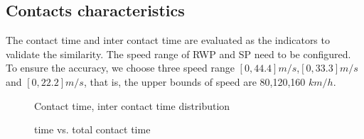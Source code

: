 \subsection{Contacts characteristics}

The contact time and inter contact time are evaluated as the indicators to validate the similarity. The speed range of RWP and SP need to be configured. To ensure the accuracy, we choose three speed range $[0,44.4]m/s$,$[0,33.3]m/s$ and $[0,22.2]m/s$, that is, the upper bounds of speed are 80,120,160 $km/h$.


\begin{figure}[!h]
\centering
{}
\caption{Contact time, inter contact time distribution}\label{figure_contacts}
\end{figure}


\begin{figure}[!h]
\centering
{}
\caption{time vs. total contact time}\label{figure_total_contact_time}
\end{figure}

